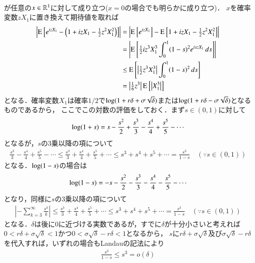 \begin{description}
\begin{align}
		\end{align}
		が任意の$x \in \mathbb{R}^1$に対して成り立つ($x=0$の場合でも明らかに成り立つ)．
		$x$を確率変数$zX_1$に置き換えて期待値を取れば
		\begin{align}
			\left| \operatorname{E}_{}^{} \left[ e^{izX_1} - \left( 1 + izX_1 - \tfrac{1}{2}z^2X_1^2 \right) \right] \right|
			&= \left| \operatorname{E}_{}^{} \left[ e^{izX_1} \right] - \operatorname{E}_{}^{} \left[ 1 + izX_1 - \tfrac{1}{2}z^2X_1^2 \right] \right| \\
			&= \left| \operatorname{E}_{}^{} \left[ \tfrac{1}{2}iz^3X_1^3 \int_{0}^{1} (1-s)^2e^{iszX_1}\, ds \right] \right| \\
			&\leq \operatorname{E}_{}^{} \left[ \left| \tfrac{1}{2}z^3X_1^3 \right| \int_{0}^{1} (1-s)^2\, ds \right] \\
			&= \left|\tfrac{1}{6}z^3 \right| \operatorname{E}_{}^{} \left[ \left| X_1^3 \right| \right] \label{eq:finance_Q2_1}
		\end{align}
		となる．確率変数$X_1$は確率$1/2$で$\operatorname{log} (1 + r \delta + \sigma \sqrt{\delta})$または$\operatorname{log} (1 + r \delta - \sigma \sqrt{\delta})$となるものであるから，
		ここでこの対数の評価をしておく．まず$s \in (0,1)$に対して
		\begin{align}
			\operatorname{log} (1 + s) = s - \frac{s^2}{2} + \frac{s^3}{3} - \frac{s^4}{4} + \frac{s^5}{5} - \cdots
		\end{align}
		となるが，$s$の3乗以降の項について
		\begin{align}
			\frac{s^3}{3} - \frac{s^4}{4} + \frac{s^5}{5} - \cdots \leq \frac{s^3}{3} + \frac{s^4}{4} + \frac{s^5}{5} + \cdots
			\leq s^3 + s^4 + s^5 + \cdots
			= \frac{s^3}{1-s} \quad (\because s \in (0,1))
		\end{align}
		となる．$\operatorname{log} (1 - s)$の場合は
		\begin{align}
			\operatorname{log} (1 - s) = -s - \frac{s^2}{2} - \frac{s^3}{3} - \frac{s^4}{4} - \frac{s^5}{5} - \cdots
		\end{align}
		となり，同様に$s$の3乗以降の項について
		\begin{align}
			\left| - \sum_{k=3}^{\infty} \frac{s^k}{k} \right| \leq \frac{s^3}{3} + \frac{s^4}{4} + \frac{s^5}{5} + \cdots
			\leq s^3 + s^4 + s^5 + \cdots
			= \frac{s^3}{1-s} \quad (\because s \in (0,1))
		\end{align}
		となる．$\delta$は後に0に近づける実数であるが，すでに$\delta$が十分小さいと考えれば$0 < r \delta + \sigma \sqrt{\delta} < 1$かつ$0 < \sigma \sqrt{\delta} - r \delta < 1$となるから，
		$s$に$r \delta + \sigma \sqrt{\delta}$及び$\sigma \sqrt{\delta} - r \delta$を代入すれば，いずれの場合もLandauの記法により
		\begin{align}
			\frac{s^3}{1-s} \leq s^3 = o(\delta)

\end{align}
\end{description}
